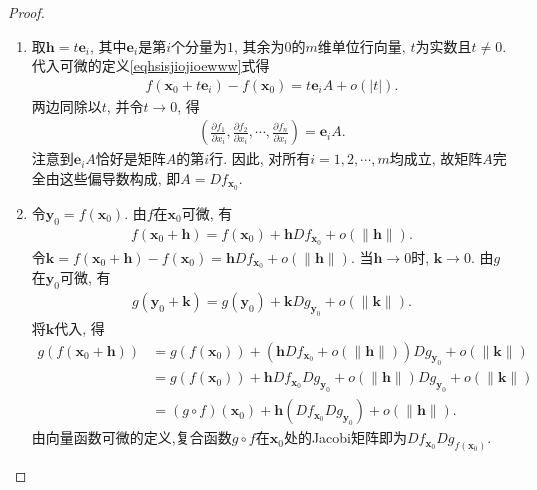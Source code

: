 \documentclass[../../main.tex]{subfiles}%
\begin{document}
\begin{proof}
\begin{enumerate}[(1)]
\item 取$\bm{h} = t\bm{e}_i$, 其中$\bm{e}_i$是第$i$个分量为$1$, 其余为$0$的$m$维单位行向量, $t$为实数且$t \neq 0$.
代入可微的定义\eqref{eqhsisjiojioewww}式得
\begin{align*}
f(\bm{x}_0 + t\bm{e}_i) - f(\bm{x}_0) = t\bm{e}_i A + o(|t|).
\end{align*}
两边同除以$t$, 并令$t \to 0$, 得
\begin{align*}
\left( \frac{\partial f_1}{\partial x_i}, \frac{\partial f_2}{\partial x_i}, \cdots, \frac{\partial f_n}{\partial x_i} \right) = \bm{e}_i A.
\end{align*}
注意到$\bm{e}_i A$恰好是矩阵$A$的第$i$行. 因此, 对所有$i = 1, 2, \cdots, m$均成立, 故矩阵$A$完全由这些偏导数构成, 即$A = Df_{\bm{x}_0}$.
\item 令$\bm{y}_0 = f(\bm{x}_0)$. 由$f$在$\bm{x}_0$可微, 有
\begin{align*}
f(\bm{x}_0 + \bm{h}) = f(\bm{x}_0) + \bm{h} Df_{\bm{x}_0} + o(\|\bm{h}\|).
\end{align*}
令$\bm{k} = f(\bm{x}_0 + \bm{h}) - f(\bm{x}_0) = \bm{h} Df_{\bm{x}_0} + o(\|\bm{h}\|)$. 当$\bm{h} \to 0$时, $\bm{k} \to 0$. 由$g$在$\bm{y}_0$可微, 有
\begin{align*}
g(\bm{y}_0 + \bm{k}) = g(\bm{y}_0) + \bm{k} Dg_{\bm{y}_0} + o(\|\bm{k}\|).
\end{align*}
将$\bm{k}$代入, 得
\begin{align*}
g(f(\bm{x}_0 + \bm{h})) &= g(f(\bm{x}_0)) + (\bm{h} Df_{\bm{x}_0} + o(\|\bm{h}\|)) Dg_{\bm{y}_0} + o(\|\bm{k}\|) \\
&= g(f(\bm{x}_0)) + \bm{h} Df_{\bm{x}_0} Dg_{\bm{y}_0} + o(\|\bm{h}\|) Dg_{\bm{y}_0} + o(\|\bm{k}\|) \\
&= (g \circ f)(\bm{x}_0) + \bm{h} (Df_{\bm{x}_0} Dg_{\bm{y}_0}) + o(\|\bm{h}\|).
\end{align*}
由向量函数可微的定义,复合函数$g \circ f$在$\bm{x}_0$处的Jacobi矩阵即为$Df_{\bm{x}_0} Dg_{f(\bm{x}_0)}$.
\end{enumerate}
\end{proof}
\end{document}
